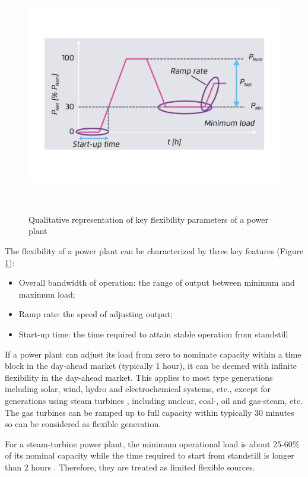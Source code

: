 \begin{figure}[h!]
	\label{fig:power-plant-flexibility}
	\includegraphics[scale=0.4]{Figures/PowerPlantFlexibility.pdf}
	\caption{Qualitative representation of key flexibility parameters of a power plant\cite{AgoraEnergiewende2017}}\
\end{figure}

The flexibility of a power plant can be characterized by three key features\cite{AgoraEnergiewende2017} (Figure \ref{fig:power-plant-flexibility}): 
\begin{itemize}
	\item Overall bandwidth of operation: the range of output between minimum and maximum load;
	\item Ramp rate: the speed of adjusting output;
	\item Start-up time: the time required to attain stable operation from standstill
\end{itemize}

If a power plant can adjust its load from zero to nominate capacity within a time block in the day-ahead market (typically 1 hour), it can be deemed with infinite flexibility in the day-ahead market. This applies to most type generations including solar, wind, hydro and electrochemical systems, etc., except for generations using steam turbines \cite{AgoraEnergiewende2017}, including nuclear, coal-, oil and gas-steam, etc. The gas turbines can be ramped up to full capacity within typically 30 minutes\cite{Siemens}\cite{GE} so can be considered as flexible generation.

For a steam-turbine power plant, the minimum operational load is about 25-60\% of its nominal capacity while the time required to start from standstill is longer than 2 hours \cite{AgoraEnergiewende2017}. Therefore, they are treated as limited flexible sources.

